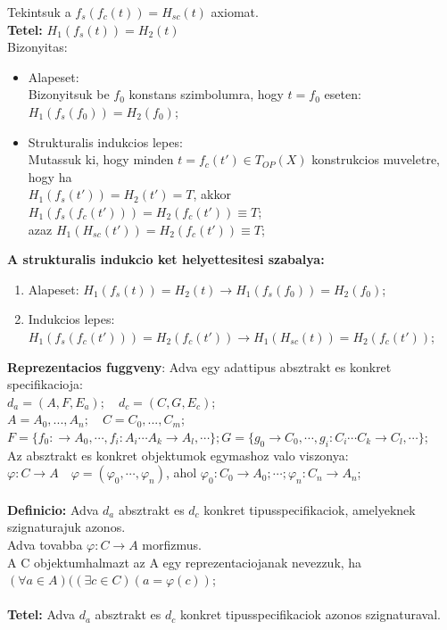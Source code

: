 \documentclass[a4paper,10pt]{article}
\begin{document}
Tekintsuk a $f_s(f_c(t))=H_{sc}(t)$ axiomat.\\
\textbf{Tetel:} $H_1(f_s(t)) = H_2(t)$\\
Bizonyitas:
\begin{itemize}
\item Alapeset:\\
\indent Bizonyitsuk be $f_0$ konstans szimbolumra, hogy $t=f_0$ eseten: $H_1(f_s(f_0)) = H_2(f_0)$;
\item Strukturalis indukcios lepes:\\
\indent Mutassuk ki, hogy minden $t = f_c(t') \in T_{OP}(X)$ konstrukcios muveletre, hogy ha\\
$H_1(f_s(t')) = H_2(t')=T$, akkor $H_1(f_s(f_c(t'))) = H_2(f_c(t')) \equiv T$;\\
\indent azaz $H_1(H_{sc}(t')) = H_2(f_c(t')) \equiv T$;
\end{itemize}
\textbf{A strukturalis indukcio ket helyettesitesi szabalya:}
\begin{enumerate}
\item Alapeset: $H_1(f_s(t)) = H_2(t) \to H_1(f_s(f_0)) = H_2(f_0)$;
\item Indukcios lepes: $H_1(f_s(f_c(t'))) = H_2(f_c(t')) \to H_1(H_{sc}(t)) = H_2(f_c(t'))$;
\end{enumerate}
\textbf{Reprezentacios fuggveny}:
Adva egy adattipus absztrakt es konkret specifikacioja:\\
$d_a=(A,F,E_a); \quad d_c=(C, G, E_c)$;\\
$A={A_0, ..., A_n}; \quad C={C_0, ..., C_m}$;\\
$F=\lbrace f_0:\to A_0, \cdots, f_i:A_i\cdots A_k\to A_l, \cdots\rbrace; G=\lbrace g_0 \to C_0, \cdots, g_i:C_i\cdots C_k\to C_l, \cdots\rbrace$;\\
Az absztrakt es konkret objektumok egymashoz valo viszonya:\\
$\varphi: C\to A \quad \varphi=(\varphi_0, \cdots, \varphi_n)$, ahol $\varphi_0:C_0\to A_0; \cdots; \varphi_n:C_n \to A_n$;\\ \\
\textbf{Definicio:} Adva $d_a$ absztrakt es $d_c$ konkret tipusspecifikaciok, amelyeknek szignaturajuk azonos.\\
Adva tovabba $\varphi: C\to A$ morfizmus.\\
A C objektumhalmazt az A egy reprezentaciojanak nevezzuk, ha $(\forall a \in A)((\exists c \in C)(a=\varphi(c))$;\\ \\
\textbf{Tetel:} Adva $d_a$ absztrakt es $d_c$ konkret tipusspecifikaciok azonos szignaturaval.\\
\end{document}

